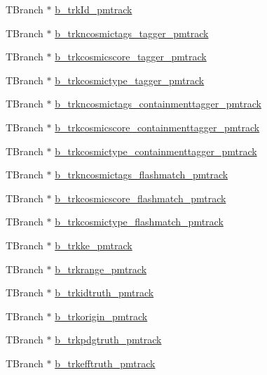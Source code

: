 \begin{DoxyCompactItemize}
T\-Branch $\ast$ \hyperlink{classanatree_ae4581986c9bf7a70e5f6f60daed8c13b}{b\-\_\-trk\-Id\-\_\-pmtrack}
\item 
T\-Branch $\ast$ \hyperlink{classanatree_a5a5992e116d6ddedab039dc81bdaa81a}{b\-\_\-trkncosmictags\-\_\-tagger\-\_\-pmtrack}
\item 
T\-Branch $\ast$ \hyperlink{classanatree_acea80ce051ac4c151ff166324d320ea6}{b\-\_\-trkcosmicscore\-\_\-tagger\-\_\-pmtrack}
\item 
T\-Branch $\ast$ \hyperlink{classanatree_a8298ed44e725fbdeca0285e241ff0b8b}{b\-\_\-trkcosmictype\-\_\-tagger\-\_\-pmtrack}
\item 
T\-Branch $\ast$ \hyperlink{classanatree_a9a433cf0b8b60c1b203eeb85943ec883}{b\-\_\-trkncosmictags\-\_\-containmenttagger\-\_\-pmtrack}
\item 
T\-Branch $\ast$ \hyperlink{classanatree_a9f95ac753ddc4695f5bd2744ca1f101a}{b\-\_\-trkcosmicscore\-\_\-containmenttagger\-\_\-pmtrack}
\item 
T\-Branch $\ast$ \hyperlink{classanatree_a379540dbdb76f41552ff598f7084417d}{b\-\_\-trkcosmictype\-\_\-containmenttagger\-\_\-pmtrack}
\item 
T\-Branch $\ast$ \hyperlink{classanatree_a32a1356cca07e211dd87055dff9509e7}{b\-\_\-trkncosmictags\-\_\-flashmatch\-\_\-pmtrack}
\item 
T\-Branch $\ast$ \hyperlink{classanatree_a31f69bca282d80ba19e9e2e8969c195c}{b\-\_\-trkcosmicscore\-\_\-flashmatch\-\_\-pmtrack}
\item 
T\-Branch $\ast$ \hyperlink{classanatree_a2141229491160d7b5787b70b311b97c0}{b\-\_\-trkcosmictype\-\_\-flashmatch\-\_\-pmtrack}
\item 
T\-Branch $\ast$ \hyperlink{classanatree_a70970a51d3ea728b0feec5c368687477}{b\-\_\-trkke\-\_\-pmtrack}
\item 
T\-Branch $\ast$ \hyperlink{classanatree_ae0d52d406a991b37a57c790471446a65}{b\-\_\-trkrange\-\_\-pmtrack}
\item 
T\-Branch $\ast$ \hyperlink{classanatree_a4604605c7bbdc556d44563ca0919dd9a}{b\-\_\-trkidtruth\-\_\-pmtrack}
\item 
T\-Branch $\ast$ \hyperlink{classanatree_a911c9395d91673d18593a99365d3c2c2}{b\-\_\-trkorigin\-\_\-pmtrack}
\item 
T\-Branch $\ast$ \hyperlink{classanatree_a7f6fe6ec9370774fcf0342c2939c10c0}{b\-\_\-trkpdgtruth\-\_\-pmtrack}
\item 
T\-Branch $\ast$ \hyperlink{classanatree_a108fe48335adb824b5d865f6c6edba3a}{b\-\_\-trkefftruth\-\_\-pmtrack}

\end{DoxyCompactItemize}

